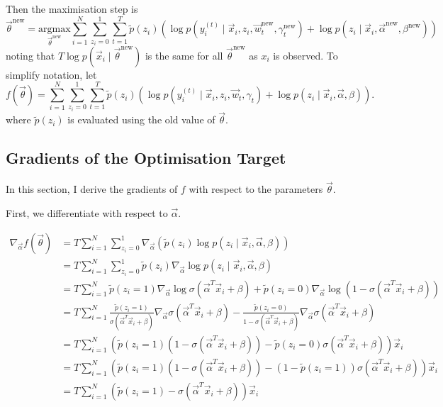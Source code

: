         Then the maximisation step is
        \[
            \vec \theta^{\text{new}} = \underset{\vec \theta^{\text{new}}}{\mbox{argmax}} \sum_{i = 1}^N \sum_{z_i = 0}^1 \sum_{t = 1}^T \tilde p(z_i) (\log p(y_i^{(t)}\mid \vec x_i, z_i, \vec w_t^{\text{new}}, \gamma_t^{\text{new}}) + \log p(z_i \mid \vec x_i, \vec \alpha^{\text{new}}, \beta^{\text{new}}))
        \]
        noting that $T \log p(\vec x_i \mid \vec \theta^{\text{new}})$ is the same for all $\vec \theta^{\text{new}}$ as $x_i$ is observed. To simplify notation, let
        \[
            f(\vec \theta) = \sum_{i = 1}^N \sum_{z_i = 0}^1 \sum_{t = 1}^T \tilde p(z_i) (\log p(y_i^{(t)}\mid \vec x_i, z_i, \vec w_t, \gamma_t) + \log p(z_i \mid \vec x_i, \vec \alpha, \beta)).
        \]
        where $\tilde p(z_i)$ is evaluated using the old value of $\vec \theta$.

    \newpage
    \subsection{Gradients of the Optimisation Target}

        In this section, I derive the gradients of $f$ with respect to the parameters $\vec \theta$.

        First, we differentiate with respect to $\vec \alpha$.

        \begin{align*}
            \nabla_{\vec \alpha} f(\vec \theta) &= T \sum_{i = 1}^N \sum_{z_i = 0}^1 \nabla_{\vec \alpha} (\tilde p(z_i) \log p(z_i \mid \vec x_i, \vec \alpha, \beta))\\
                &= T \sum_{i = 1}^N \sum_{z_i = 0}^1 \tilde p(z_i) \nabla_{\vec \alpha} \log p(z_i \mid \vec x_i, \vec \alpha, \beta)\\
                &= T \sum_{i = 1}^N \tilde p(z_i = 1) \nabla_{\vec \alpha} \log \sigma(\vec \alpha^T \vec x_i + \beta) + \tilde p(z_i = 0) \nabla_{\vec \alpha} \log (1 - \sigma(\vec \alpha^T \vec x_i + \beta))\\
                &= T \sum_{i = 1}^N \frac{\tilde p(z_i = 1)}{\sigma(\vec \alpha^T \vec x_i + \beta)} \nabla_{\vec \alpha} \sigma(\vec \alpha^T \vec x_i + \beta) - \frac{\tilde p(z_i = 0)}{1 - \sigma(\vec \alpha^T \vec x_i + \beta)} \nabla_{\vec \alpha} \sigma(\vec \alpha^T \vec x_i + \beta)\\
                &= T \sum_{i = 1}^N \left(\tilde p(z_i = 1) (1 - \sigma(\vec \alpha^T \vec x_i + \beta)) - \tilde p(z_i = 0) \sigma(\vec \alpha^T \vec x_i + \beta)\right) \vec x_i\\
                &= T \sum_{i = 1}^N \left(\tilde p(z_i = 1) (1 - \sigma(\vec \alpha^T \vec x_i + \beta)) - (1 - \tilde p(z_i = 1)) \sigma(\vec \alpha^T \vec x_i + \beta)\right) \vec x_i\\
                &= T \sum_{i = 1}^N \left(\tilde p(z_i = 1) - \sigma(\vec \alpha^T \vec x_i + \beta)\right) \vec x_i\\
        \end{align*}

